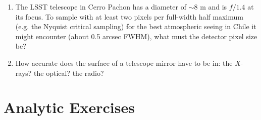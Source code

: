 \begin{enumerate}
\item The LSST telescope in Cerro Pachon has a diameter of $\sim 8$ m
    and is $f/1.4$ at its focus. To sample with at least two pixels
    per full-width half maximum (e.g. the Nyquist critical sampling)
    for the best atmospheric seeing in Chile it might encounter (about
    0.5 arcsec FWHM), what must the detector pixel size be?

\item How accurate does the surface of a telescope mirror have to be
    in: the $X$-rays? the optical? the radio?
\end{enumerate} 

\section{Analytic Exercises}

